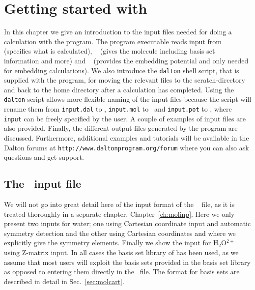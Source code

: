 \chapter{Getting started with {\dalton}}\label{ch:starting}

In this chapter we give an introduction to the input files needed
for doing a calculation with the {\dalton} program. The program executable reads input
from \dalinp\  (specifies what is calculated), \molinp\  (gives
the molecule including basis set information and more) and \potinp\  (provides the embedding potential and only needed for
embedding calculations). We also introduce the \verb|dalton| shell script,
that is supplied with the program, for moving the relevant files to the
scratch-directory and back to the home directory after a calculation has completed.
Using the \verb|dalton| script allows more flexible naming of the input files because the script will rename them from \verb|input.dal| to \dalinp, \verb|input.mol| to \molinp\ and \verb|input.pot| to \potinp, where \verb|input| can be freely specified by the user.
A couple of examples of input files are also provided. Finally, the different output
files generated by the program are discussed. Furthermore, additional examples and 
tutorials will be available in the
Dalton forums at \verb|http://www.daltonprogram.org/forum| where you can also ask 
questions and get support.

\section{The \molinp\ input file}

We will not go into great detail here of the input format of the \molinp\  file, as it is treated thoroughly in a separate chapter,
Chapter~\ref{ch:molinp}. Here we only present two inputs for
water; one
using Cartesian coordinate input and
automatic symmetry detection and
the other using Cartesian coordinates and where we explicitly give the
symmetry elements. Finally we show the input for H$_{2}$O$^{2+}$
using Z-matrix input. In
all cases the basis set library of {\dalton} has been used, as we
assume that most users will exploit the basis sets provided in the basis
set library as opposed to entering them directly in the \molinp\ file. The format for basis sets are described in detail in Sec.~\ref{sec:molcart}.

